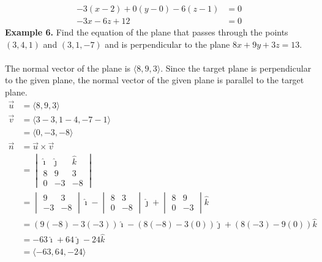 \documentclass{report}
\begin{document}
\vspace{-3.5em}
\begin{align*}
    -3(x - 2) + 0(y - 0) - 6(z - 1) & = 0 \\
    -3x - 6z + 12                   & = 0
\end{align*}
\newpage
\noindent\textbf{Example 6. } Find the equation of the plane that passes through the points $(3, 4, 1)$ and $(3, 1, -7)$ and is perpendicular to the plane $8x + 9y + 3z  = 13$.
~\\\\
The normal vector of the plane is $\langle 8, 9, 3 \rangle$. Since the target plane is perpendicular to the given plane, the normal vector of the given plane is parallel to the target plane.
\begin{align*}
    \vec{u} & = \langle 8, 9, 3 \rangle                                                          \\
    \vec{v} & = \langle 3 - 3, 1 - 4, -7 - 1 \rangle                                             \\
            & = \langle 0, -3, -8 \rangle                                                        \\
    \vec{n} & = \vec{u} \times \vec{v}                                                           \\
            & = \begin{vmatrix}
                    \hat{\imath} & \hat{\jmath} & \hat{k} \\
                    8            & 9            & 3       \\
                    0            & -3           & -8
                \end{vmatrix}                       \\
            & = \begin{vmatrix}
                    9  & 3  \\
                    -3 & -8
                \end{vmatrix}\hat{\imath} - \begin{vmatrix}
                                                8 & 3  \\
                                                0 & -8
                                            \end{vmatrix}\hat{\jmath} + \begin{vmatrix}
                                                                            8 & 9  \\
                                                                            0 & -3
                                                                        \end{vmatrix}\hat{k}     \\
            & = (9(-8) - 3(-3))\hat{\imath} - (8(-8) - 3(0))\hat{\jmath} + (8(-3) - 9(0))\hat{k} \\
            & = -63\hat{\imath} + 64\hat{\jmath} - 24\hat{k}                                     \\
            & = \langle -63, 64, -24 \rangle
\end{align*}
\end{document}
